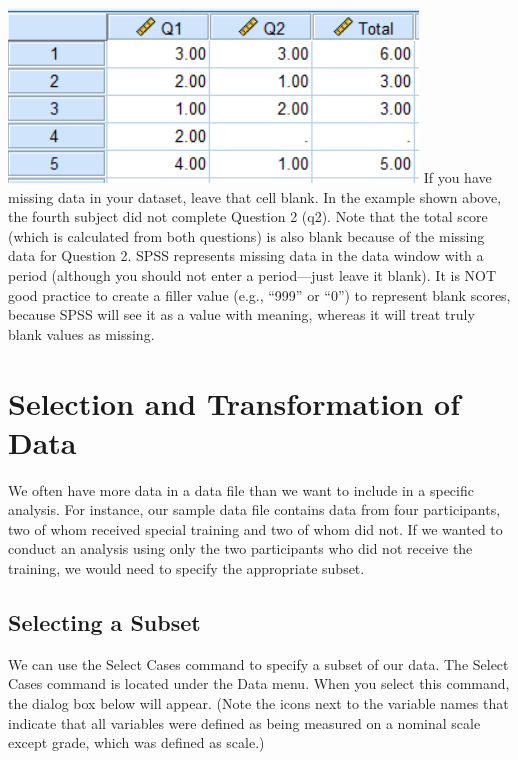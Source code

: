 \documentclass[
]{book}
\begin{document}
\includegraphics{MissingData1.png}
If you have missing data in your dataset, leave that cell blank. In the example shown above, the fourth subject did not complete Question 2 (q2). Note that the total score (which is calculated from both questions) is also blank because of the missing data for Question 2. SPSS represents missing data in the data window with a period (although you should not enter a period---just leave it blank). It is NOT good practice to create a filler value (e.g., ``999'' or ``0'') to represent blank scores, because SPSS will see it as a value with meaning, whereas it will treat truly blank values as missing.

\hypertarget{selection-and-transformation-of-data}{%
\section{Selection and Transformation of Data}\label{selection-and-transformation-of-data}}

We often have more data in a data file than we want to include in a specific analysis. For instance, our sample data file contains data from four participants, two of whom received special training and two of whom did not. If we wanted to conduct an analysis using only the two participants who did not receive the training, we would need to specify the appropriate subset.

\hypertarget{selecting-a-subset}{%
\subsection{Selecting a Subset}\label{selecting-a-subset}}

We can use the Select Cases command to specify a subset of our data. The Select Cases command is located under the Data menu. When you select this command, the dialog box below will appear. (Note the icons next to the variable names that indicate that all variables were defined as being measured on a nominal scale except grade, which was defined as scale.)
\end{document}
